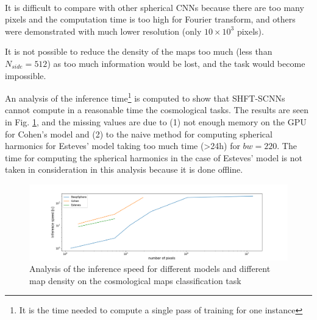 \documentclass[11pt]{report}
\begin{document}
\paragraph*{}
It is difficult to compare with other spherical CNNs because there are too many pixels and the computation time is too high for Fourier transform, and others were demonstrated with much lower resolution (only $10\times 10^3$ pixels).

It is not possible to reduce the density of the maps too much (less than $N_{side}=512$) as too much information would be lost, and the task would become impossible.

An analysis of the inference time\footnote{It is the time needed to compute a single pass of training for one instance} is computed to show that SHFT-SCNNs cannot compute in a reasonable time the cosmological tasks. The results are seen in Fig. \ref{fig:cosmo_time}, and the missing values are due to (1) not enough memory on the GPU for Cohen's model and (2) to the naive method for computing spherical harmonics for Esteves' model taking too much time (>24h) for $bw=220$. The time for computing the spherical harmonics in the case of Esteves' model is not taken in consideration in this analysis because it is done offline.

\begin{figure}[!ht]
    \centering
    \includegraphics[width=\linewidth]{figures/cosmo_time.png}
    \caption{Analysis of the inference speed for different models and different map density on the cosmological maps classification task}
    \label{fig:cosmo_time}
\end{figure}
\end{document}
